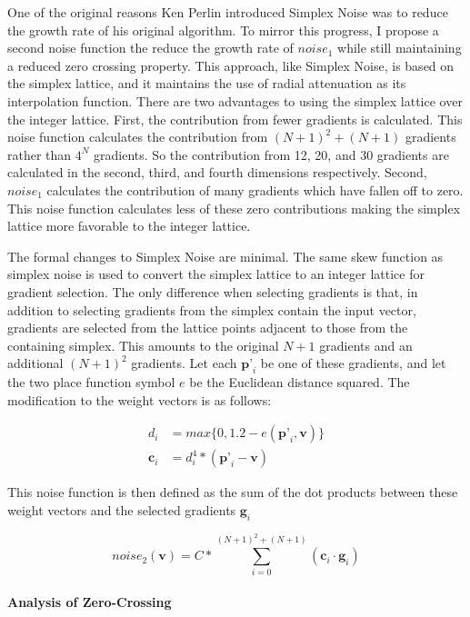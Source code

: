 \documentclass[12pt]{article}
\theoremstyle{definition}
\theoremstyle{remark}
\begin{document}
One of the original reasons Ken Perlin introduced Simplex Noise was to reduce the growth rate of his original algorithm. To mirror this progress, I propose a second noise function the reduce the growth rate of $noise_1$ while still maintaining a reduced zero crossing property. This approach, like Simplex Noise, is based on the simplex lattice, and it maintains the use of radial attenuation as its interpolation function. There are two advantages to using the simplex lattice over the integer lattice. First, the contribution from fewer gradients is calculated. This noise function calculates the contribution from $(N+1)^2+(N+1)$ gradients rather than $4^N$ gradients. So the contribution from 12, 20, and 30 gradients are calculated in the second, third, and fourth dimensions respectively. Second, $noise_1$ calculates the contribution of many gradients which have fallen off to zero. This noise function calculates less of these zero contributions making the simplex lattice more favorable to the integer lattice.

The formal changes to Simplex Noise are minimal. The same skew function as simplex noise is used to convert the simplex lattice to an integer lattice for gradient selection. The only difference when selecting gradients is that, in addition to selecting gradients from the simplex contain the input vector, gradients are selected from the lattice points adjacent to those from the containing simplex. This amounts to the original $N+1$ gradients and an additional $(N+1)^2$ gradients. Let each $\textbf{p'}_i$ be one of these gradients, and let the two place function symbol $e$ be the Euclidean distance squared. The modification to the weight vectors is as follows:

\begin{align*}
d_i &= max\{0, 1.2 - e(\textbf{p'}_i,\textbf{v})\} \\
\textbf{c}_i &= d_i^4 * (\textbf{p'}_i - \textbf{v})
\end{align*}

This noise function is then defined as the sum of the dot products between these weight vectors and the selected gradients $\textbf{g}_i$

\begin{equation*}
noise_2(\textbf{v})=C*\sum_{i=0}^{(N+1)^2+(N+1)}(\textbf{c}_i \cdot \textbf{g}_i)
\end{equation*}

\paragraph{Analysis of Zero-Crossing}
\end{document}
